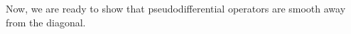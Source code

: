 \documentclass[12pt]{article}
\begin{document}
%
%
%

Now, we are ready to show that pseudodifferential operators are smooth away from the diagonal. 
\end{document}

